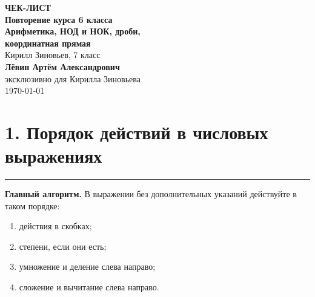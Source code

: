 \documentclass[a4paper,12pt]{article}
\newcommand{\sectionline}{
  \par
  \vspace{-0.35em}
  {\color{accent}\rule{\linewidth}{0.5pt}}
  \vspace{0.55em}
}
\newcommand{\skill}[1]{\textbf{\color{darkaccent}#1}}
\begin{document}

\begin{titlepage}
\thispagestyle{empty}
\centering

\vspace*{28mm}

{\Large\color{accent}\textbf{ЧЕК-ЛИСТ}}\\[9mm]

{\huge\bfseries
Повторение курса 6 класса
}\\[3mm]

{\Large\bfseries
Арифметика, НОД и НОК, дроби,\\
координатная прямая
}\\[16mm]

{\large
Кирилл Зиновьев, 7 класс
}\\[24mm]

{\large\color{darkaccent}
\textbf{Лёвин Артём Александрович}
}\\[2mm]

{\normalsize
эксклюзивно для Кирилла Зиновьева
}\\[12mm]

{\normalsize \today}

\vfill


\end{titlepage}


\section*{1. Порядок действий в числовых выражениях}
\sectionline

\skill{Главный алгоритм.}
В выражении без дополнительных указаний действуйте в таком порядке:

\begin{enumerate}[label=\arabic*)]
  \item действия в скобках;
  \item степени, если они есть;
  \item умножение и деление слева направо;
  \item сложение и вычитание слева направо.
\end{enumerate}
\end{document}
